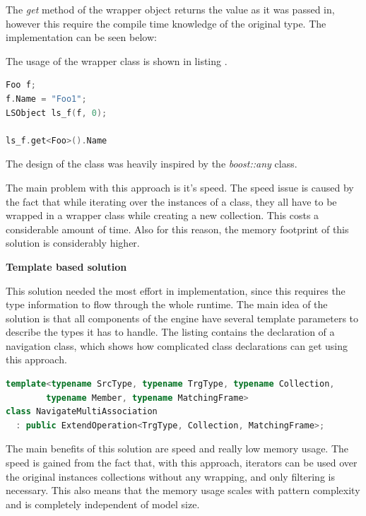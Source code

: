 The \emph{get} method of the wrapper object returns the value as it was passed
in, however this require the compile time knowledge of the original type. The
implementation can be seen below:

The usage of the wrapper class is shown in listing .

\begin{lstlisting}[frame=single,float=!ht,language=C++,
label=listing:wrapper_usage, caption=Wrapper object usage.]
Foo f;
f.Name = "Foo1";
LSObject ls_f(f, 0);

ls_f.get<Foo>().Name
\end{lstlisting}

The design of the class was heavily inspired by the \emph{boost::any} class.

The main problem with this approach is it's speed. The speed issue is caused by
the fact that while iterating over the instances of a class, they all have to be
wrapped in a wrapper class while creating a new collection. This costs a
considerable amount of time. Also for this reason, the memory footprint of this
solution is considerably higher.

\textbf{Template based solution}

This solution needed the most effort in implementation, since this requires
the type information to flow through the whole runtime. The main idea of the
solution is that all components of the engine have several template parameters
to describe the types it has to handle. The listing 
contains the declaration of a navigation class, which shows how complicated
class declarations can get using this approach.

\begin{lstlisting}[frame=single,float=!ht,language=C++,
label=listing:template_example, caption=Template based approach example.]
template<typename SrcType, typename TrgType, typename Collection, 
		typename Member, typename MatchingFrame>
class NavigateMultiAssociation
  : public ExtendOperation<TrgType, Collection, MatchingFrame>;
\end{lstlisting}

The main benefits of this solution are speed and really low memory usage. The
speed is gained from the fact that, with this approach, iterators can be used
over the original instances collections without any wrapping, and only
filtering is necessary. This also means that the memory usage scales with
pattern complexity and is completely independent of model size.

